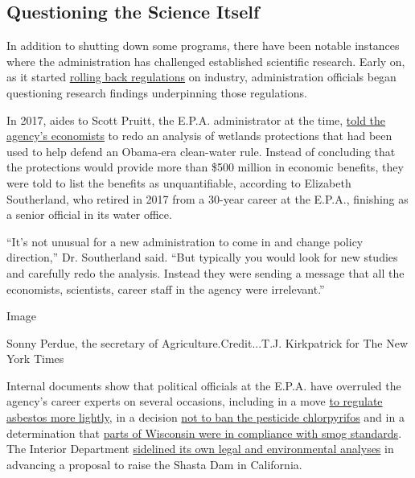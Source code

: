 \hypertarget{questioning-the-science-itself}{%
\subsection{Questioning the Science
Itself}\label{questioning-the-science-itself}}

In addition to shutting down some programs, there have been notable
instances where the administration has challenged established scientific
research. Early on, as it started
\href{https://www.nytimes3xbfgragh.onion/interactive/2019/climate/trump-environment-rollbacks.html}{rolling
back regulations} on industry, administration officials began
questioning research findings underpinning those regulations.

In 2017, aides to Scott Pruitt, the E.P.A. administrator at the time,
\href{https://www.nytimes3xbfgragh.onion/2017/08/11/us/politics/scott-pruitt-epa.html}{told
the agency's economists} to redo an analysis of wetlands protections
that had been used to help defend an Obama-era clean-water rule. Instead
of concluding that the protections would provide more than \$500 million
in economic benefits, they were told to list the benefits as
unquantifiable, according to Elizabeth Southerland, who retired in 2017
from a 30-year career at the E.P.A., finishing as a senior official in
its water office.

``It's not unusual for a new administration to come in and change policy
direction,'' Dr. Southerland said. ``But typically you would look for
new studies and carefully redo the analysis. Instead they were sending a
message that all the economists, scientists, career staff in the agency
were irrelevant.''

Image

Sonny Perdue, the secretary of Agriculture.Credit...T.J. Kirkpatrick for
The New York Times

Internal documents show that political officials at the E.P.A. have
overruled the agency's career experts on several occasions, including in
a move
\href{https://www.nytimes3xbfgragh.onion/2019/05/08/climate/epa-asbestos-rule-scientists.html}{to
regulate asbestos more lightly}, in a decision
\href{https://www.nytimes3xbfgragh.onion/2018/08/24/business/epa-pesticides-studies-epidemiology.html}{not
to ban the pesticide chlorpyrifos} and in a determination that
\href{https://www.nytimes3xbfgragh.onion/2019/05/24/climate/epa-pruitt-wisconsin-foxconn.html}{parts
of Wisconsin were in compliance with smog standards}. The Interior
Department
\href{https://www.nytimes3xbfgragh.onion/2019/09/28/climate/bernhardt-shasta-dam.html}{sidelined
its own legal and environmental analyses} in advancing a proposal to
raise the Shasta Dam in California.


